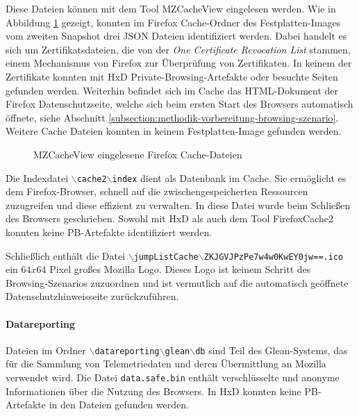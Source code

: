 \begin{appendices}
{\begin{landscape}
\begin{table}[h!]
{\begin{tabular}{cllll}
	\end{tabular}
	}
	\end{table}
\end{landscape}
}
\restoregeometry
%

Diese Dateien können mit dem Tool MZCacheView eingelesen werden.
Wie in Abbildung \ref{img:mzcacheview} gezeigt, konnten im Firefox Cache-Ordner des Festplatten-Images vom zweiten Snapshot drei JSON Dateien identifiziert werden. Dabei handelt es sich um Zertifikatsdateien, die von der \textit{One Certificate Revocation List} stammen, einem Mechanismus von Firefox zur Überprüfung von Zertifikaten. In keinem der Zertifikate konnten mit HxD Private-Browsing-Artefakte oder besuchte Seiten gefunden werden. \cite{TechSupportGuy.05.06.2023}
Weiterhin befindet sich im Cache das HTML-Dokument der Firefox Datenschutzseite, welche sich beim ersten Start des Browsers automatisch öffnete, siehe Abschnitt \ref{subsection:methodik-vorbereitung-browsing-szenario}.
Weitere Cache Dateien konnten in keinem Festplatten-Image gefunden werden.
\begin{figure}[h!]
	\caption{MZCacheView eingelesene Firefox Cache-Dateien}
	\label{img:mzcacheview}
\end{figure}
Die Indexdatei \texttt{$\backslash$cache2$\backslash$index} dient als Datenbank im Cache. Sie ermöglicht es dem Firefox-Browser, schnell auf die zwischengespeicherten Ressourcen zuzugreifen und diese effizient zu verwalten. In diese Datei wurde beim Schließen des Browsers geschrieben. Sowohl mit HxD als auch dem Tool FirefoxCache2 konnten keine PB-Artefakte identifiziert werden.

Schließlich enthält die Datei \texttt{$\backslash$jumpListCache$\backslash$ZKJGVJPzPe7w4w0KwEY0jw==.ico} ein $64x64$ Pixel großes Mozilla Logo. Dieses Logo ist keinem Schritt des Browsing-Szenarios zuzuordnen und ist vermutlich auf die automatisch geöffnete Datenschutzhinweisseite zurückzuführen.

\paragraph*{Datareporting}
Dateien im Ordner \texttt{$\backslash$datareporting$\backslash$glean$\backslash$db} sind Teil des Glean-Systems, das für die Sammlung von Telemetriedaten und deren Übermittlung an Mozilla verwendet wird. \cite{GitHub.05.06.2023}
Die Datei \texttt{data.safe.bin} enthält verschlüsselte und anonyme Informationen über die Nutzung des Browsers. In HxD konnten keine PB-Artefakte in den Dateien gefunden werden. 


\end{appendices}
